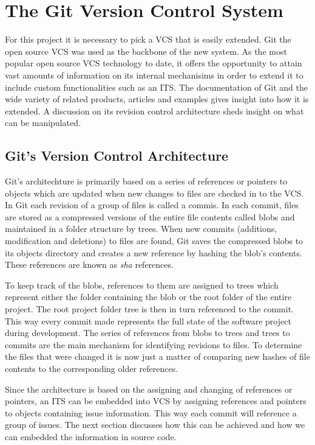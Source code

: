 \documentclass{mproj}
\begin{document}
\section{The Git Version Control System}

For this project it is necessary to pick a VCS that is easily extended. Git the open source VCS was used as the backbone of the new system. As the most popular open source VCS  technology to date, it offers the opportunity to attain vast amounts of information on its internal mechanisims in order to extend it to include custom functionalities such as an ITS. The documentation of Git and the wide variety of related products, articles and examples gives insight into how it is extended. A discussion on its revision control architecture sheds insight on what can be manipulated.



\subsection{Git's Version Control Architecture}

Git's architechture is primarily based on a series of references or pointers to objects which are updated when new changes to files are checked in to the VCS. In Git each revision of a group of files is called a commis. In each commit, files are stored as a compressed versions of the entire file contents called blobs and maintained in a folder structure by trees. When new commits (additions, modification and deletions) to files are found, Git saves the compressed blobs to its objects directory and creates a new reference by hashing the blob's contents. These references are known as \textit{sha} references. 

To keep track of the blobs, references to them are assigned to trees which represent either the folder containing the blob or the root folder of the entire project.  The root project folder tree is then in turn referenced to the commit. This way every commit made represents the full state of the software project during development. The series of references from blobs to trees and trees to commits are the main mechanism for identifying revisions to files. To determine the files that were changed it is now just a matter of comparing new hashes of file contents to the corresponding older references.

Since the architecture is based on the assigning and changing of references or pointers, an ITS can be embedded into VCS by assigning references and pointers to objects containing issue information. This way each commit will reference a group of issues. The next section discusses how this can be achieved and how we can embedded the information in source code.
\end{document}
